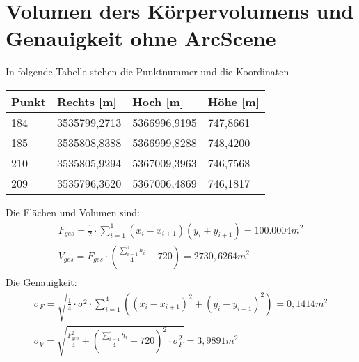 \documentclass[12pt]{article}
\begin{document}
\section{Volumen ders Körpervolumens und Genauigkeit ohne ArcScene}
In folgende Tabelle stehen die Punktnummer und die Koordinaten
\begin{table}[ht] \centering
	\begin{tabular}{|l|l|l|l|}
		\hline
		Punkt & Rechts {[}m{]} & Hoch {[}m{]} & Höhe {[}m{]} \\ \hline
		184   & 3535799,2713   & 5366996,9195 & 747,8661     \\ \hline
		185   & 3535808,8388   & 5366999,8288 & 748,4200     \\ \hline
		210   & 3535805,9294   & 5367009,3963 & 746,7568     \\ \hline
		209   & 3535796,3620   & 5367006,4869 & 746,1817     \\ \hline
	\end{tabular}
\end{table}
\newline
Die Flächen und Volumen sind:
\begin{gather*}
F_{ges} = \frac{1}{2} \cdot \sum_{i=1}^{1} (x_i - x_{i+1}) (y_i + y_{i+1}) = 100.0004 m^2 \\
V_{ges} = F_{ges} \cdot (\frac{\sum_{i=1}^{4}h_i}{4} - 720) = 2730,6264 m^2 \\
\end{gather*}
Die Genauigkeit:
\begin{gather*}
\sigma_F = \sqrt{\frac{1}{4} \cdot \sigma^2 \cdot \sum_{i=1}^{4} ((x_i - x_{i+1})^2 + (y_i - y_{i+1})^2)} = 0,1414 m^2 \\
\sigma_V = \sqrt{\frac{F_{ges}^2}{4} + (\frac{\sum_{i=1}^{4}h_i}{4} - 720)^2 \cdot \sigma_F^2} = 3,9891 m^2
\end{gather*}
\end{document}
